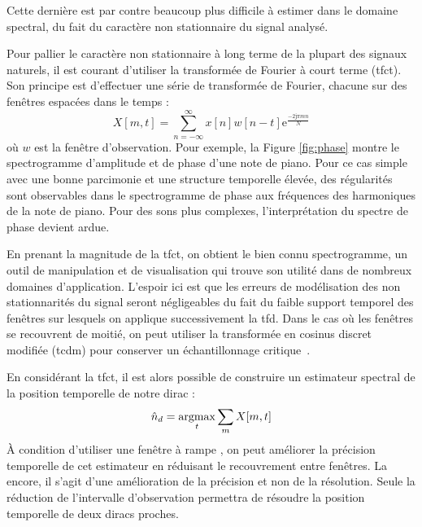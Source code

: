 Cette dernière est par contre beaucoup plus difficile à estimer dans le domaine spectral, du fait du caractère non stationnaire du signal analysé.


Pour pallier le caractère non stationnaire à long terme de la plupart des signaux naturels, il est courant d'utiliser la transformée de Fourier à court terme (tfct). Son principe est d'effectuer une série de transformée de Fourier, chacune sur des fenêtres espacées dans le temps :
\begin{equation}
X[m, t] = \sum_{n = - \infty}^{\infty} x[n] w[n-t] \mathrm{e}^{\frac{-2 \mathrm{j}  \pi m n}{N}}
\end{equation}
où $w$ est la fenêtre d'observation. Pour exemple, la Figure \ref{fig:phase} montre le spectrogramme d'amplitude et de phase d'une note de piano. Pour ce cas simple avec une bonne parcimonie et une structure temporelle élevée, des régularités sont observables dans le spectrogramme de phase aux fréquences des harmoniques de la note de piano. Pour des sons plus complexes, l'interprétation du spectre de phase devient ardue.


En prenant la magnitude de la tfct, on obtient le bien connu spectrogramme, un outil de manipulation et de visualisation qui trouve son utilité dans de nombreux domaines d'application. L'espoir ici est que les erreurs de modélisation des non stationnarités du signal seront négligeables du fait du faible support temporel des fenêtres sur lesquels on applique successivement la tfd. Dans le cas où les fenêtres se recouvrent de moitié, on peut utiliser la transformée en cosinus discret modifiée (tcdm) pour conserver un échantillonnage critique~\cite{princen1986analysis}.

En considérant la tfct, il est alors possible de construire un estimateur \og spectral \fg de la position temporelle de notre dirac :
\begin{equation}
\hat{n}_d = \operatorname*{argmax}_t \sum_m X[m, t]
\end{equation}
\`A condition d'utiliser une fenêtre \fg à rampe \og, on peut améliorer la précision temporelle de cet estimateur en réduisant le recouvrement entre fenêtres. La encore, il s'agit d'une amélioration de la précision et non de la résolution. Seule la réduction de l'intervalle d'observation permettra de résoudre la position temporelle de deux diracs proches.


